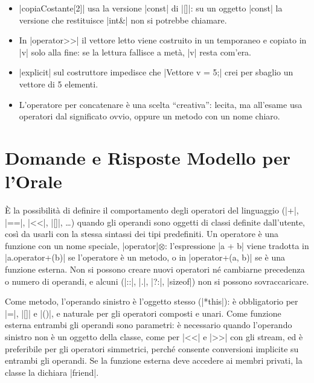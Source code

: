 \begin{consiglio}
\begin{itemize}
  \item \cc|copiaCostante[2]| usa la versione \cc|const| di \cc|[]|: su un oggetto
        \cc|const| la versione che restituisce \cc|int&| non si potrebbe chiamare.
  \item In \cc|operator>>| il vettore letto viene costruito in un temporaneo e copiato
        in \cc|v| solo alla fine: se la lettura fallisce a metà, \cc|v| resta com'era.
  \item \cc|explicit| sul costruttore impedisce che \cc|Vettore v = 5;| crei per sbaglio
        un vettore di 5 elementi.
  \item L'operatore \cc{|} per concatenare è una scelta ``creativa'': lecita, ma
        all'esame usa operatori dal significato ovvio, oppure un metodo con un nome chiaro.
\end{itemize}
\end{consiglio}

\section{Domande e Risposte Modello per l'Orale}

\begin{orale}
È la possibilità di definire il comportamento degli operatori del linguaggio
(\cc|+|, \cc|==|, \cc|<<|, \cc|[]|, \ldots) quando gli operandi sono oggetti di classi
definite dall'utente, così da usarli con la stessa sintassi dei tipi predefiniti. Un
operatore è una funzione con un nome speciale, \cc|operator|$\otimes$: l'espressione
\cc|a + b| viene tradotta in \cc|a.operator+(b)| se l'operatore è un metodo, o in
\cc|operator+(a, b)| se è una funzione esterna. Non si possono creare nuovi operatori
né cambiarne precedenza o numero di operandi, e alcuni (\cc|::|, \cc|.|, \cc|?:|,
\cc|sizeof|) non si possono sovraccaricare.
\end{orale}

\begin{orale}
Come metodo, l'operando sinistro è l'oggetto stesso (\cc|*this|): è obbligatorio per
\cc|=|, \cc|[]| e \cc|()|, e naturale per gli operatori composti e unari. Come funzione
esterna entrambi gli operandi sono parametri: è necessario quando l'operando sinistro
non è un oggetto della classe, come per \cc|<<| e \cc|>>| con gli stream, ed è preferibile
per gli operatori simmetrici, perché consente conversioni implicite su entrambi gli
operandi. Se la funzione esterna deve accedere ai membri privati, la classe la dichiara
\cc|friend|.
\end{orale}

